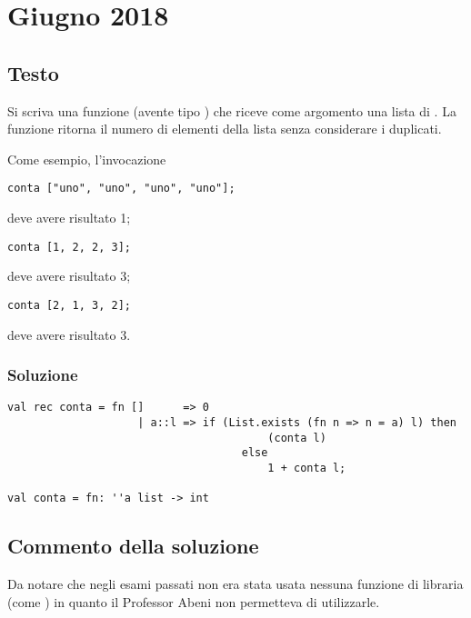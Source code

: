 \section{Giugno 2018}

\subsection{Testo}

Si scriva una funzione  (avente tipo ) che riceve come argomento una lista di .
La funzione  ritorna il numero di elementi della lista senza considerare i duplicati.

\medskip
Come esempio, l'invocazione

\begin{lstlisting}
conta ["uno", "uno", "uno", "uno"];
\end{lstlisting}

deve avere risultato 1;

\begin{lstlisting}
conta [1, 2, 2, 3];
\end{lstlisting}

deve avere risultato 3;

\begin{lstlisting}
conta [2, 1, 3, 2];
\end{lstlisting}

deve avere risultato 3.

\subsubsection{Soluzione}

\begin{lstlisting}[style = SML, caption = {Definizione della funzione \sml{conta}}]
val rec conta = fn [] 	   => 0
					| a::l => if (List.exists (fn n => n = a) l) then
		 								(conta l)
									else
										1 + conta l;

val conta = fn: ''a list -> int
\end{lstlisting}

\subsection{Commento della soluzione}

Da notare che negli esami passati non era stata usata nessuna funzione di libraria (come ) in quanto il Professor Abeni non permetteva di utilizzarle.
